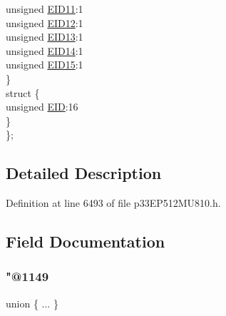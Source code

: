 \begin{DoxyCompactItemize}
\begin{tabbing}
\>\>unsigned \hyperlink{structtag_c2_r_x_f5_e_i_d_b_i_t_s_a710bdb0d602deb021b0be99066008018}{EID11}:1\\
\>\>unsigned \hyperlink{structtag_c2_r_x_f5_e_i_d_b_i_t_s_aa347bb85867bd8d4e0124f7cff8c6472}{EID12}:1\\
\>\>unsigned \hyperlink{structtag_c2_r_x_f5_e_i_d_b_i_t_s_a37d5f3edcbf6ef62f848fd4f3c584f79}{EID13}:1\\
\>\>unsigned \hyperlink{structtag_c2_r_x_f5_e_i_d_b_i_t_s_a7ffc0b0e0d99b8476b6f9a45337c17ab}{EID14}:1\\
\>\>unsigned \hyperlink{structtag_c2_r_x_f5_e_i_d_b_i_t_s_a293cd7dc1746257fa75a60cbd9383cd7}{EID15}:1\\
\>\} \\
\>struct \{\\
\>\>unsigned \hyperlink{structtag_c2_r_x_f5_e_i_d_b_i_t_s_ae80b378c9141f7c03e0b4e55b5f4b54d}{EID}:16\\
\>\} \\
\}; \\

\end{tabbing}\end{DoxyCompactItemize}


\subsection{Detailed Description}


Definition at line 6493 of file p33\+E\+P512\+M\+U810.\+h.



\subsection{Field Documentation}
\mbox{\label{structtag_c2_r_x_f5_e_i_d_b_i_t_s_a0ad265216827562af1c46982ec30fdf1}} 
\subsubsection{\texorpdfstring{"@1149}{@1149}}
{\footnotesize\ttfamily union \{ ... \} }

\mbox{\label{structtag_c2_r_x_f5_e_i_d_b_i_t_s_ae80b378c9141f7c03e0b4e55b5f4b54d}} 
